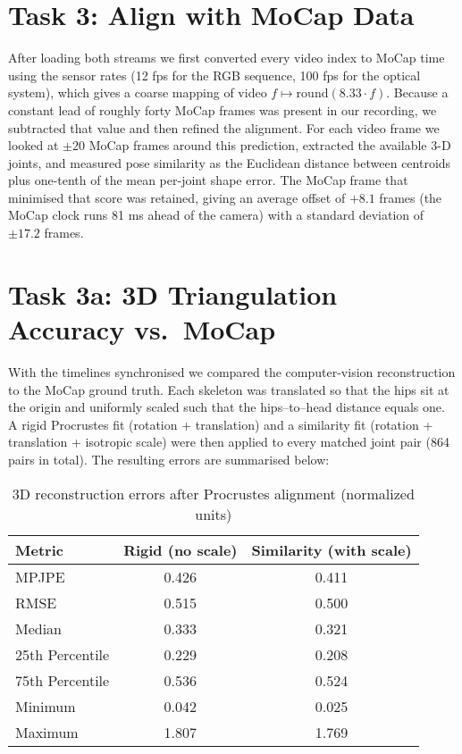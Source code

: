 \documentclass[11pt,a4paper]{article}
\begin{document}
\section*{Task 3: Align with MoCap Data}
After loading both streams we first converted every video index to MoCap time using the sensor rates (12 fps for the RGB sequence, 100 fps for the optical system), which gives a coarse mapping of video \(f \mapsto \mathrm{round}(8.33 \cdot f)\). Because a constant lead of roughly forty MoCap frames was present in our recording, we subtracted that value and then refined the alignment. For each video frame we looked at \(\pm 20\) MoCap frames around this prediction, extracted the available 3-D joints, and measured pose similarity as the Euclidean distance between centroids plus one-tenth of the mean per-joint shape error. The MoCap frame that minimised that score was retained, giving an average offset of \(+8.1\) frames (the MoCap clock runs 81 ms ahead of the camera) with a standard deviation of \(\pm 17.2\) frames.

\section*{Task 3a: 3D Triangulation Accuracy vs.\ MoCap}

With the timelines synchronised we compared the computer-vision reconstruction to the MoCap ground truth. Each skeleton was translated so that the hips sit at the origin and uniformly scaled such that the hips–to–head distance equals one. A rigid Procrustes fit (rotation + translation) and a similarity fit (rotation + translation + isotropic scale) were then applied to every matched joint pair (864 pairs in total). The resulting errors are summarised below:

\begin{table}[h]
  \centering
  \caption{3D reconstruction errors after Procrustes alignment (normalized units)}
  \label{tab:triang-vs-mocap}
  \begin{tabular}{lcc}
    \toprule
    \textbf{Metric}   & \textbf{Rigid (no scale)} & \textbf{Similarity (with scale)} \\
    \midrule
    MPJPE            & 0.426                      & 0.411                             \\
    RMSE             & 0.515                      & 0.500                             \\
    Median           & 0.333                      & 0.321                             \\
    25th Percentile  & 0.229                      & 0.208                             \\
    75th Percentile  & 0.536                      & 0.524                             \\
    Minimum          & 0.042                      & 0.025                             \\
    Maximum          & 1.807                      & 1.769                             \\
    \bottomrule
  \end{tabular}
\end{table}
\end{document}
